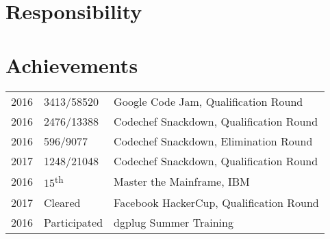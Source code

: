 \documentclass[]{deedy-resume-openfont}
\begin{document}
\begin{minipage}[t]{0.66\textwidth}

\section{Responsibility}
\sectionsep

\sectionsep


\section{Achievements}
\begin{tabular}{rll}
2016     & 3413/58520 & Google Code Jam, Qualification Round\\
2016     & 2476/13388 & Codechef Snackdown, Qualification Round\\
2016     & 596/9077   & Codechef Snackdown, Elimination Round\\
2017	 & 1248/21048 & Codechef Snackdown, Qualification Round\\
2016     & 15\textsuperscript{th}  & Master the Mainframe, IBM\\
2017     & Cleared & Facebook HackerCup, Qualification Round\\
2016     & Participated & dgplug Summer Training\\
\end{tabular}
\sectionsep

\end{minipage}
\end{document}
